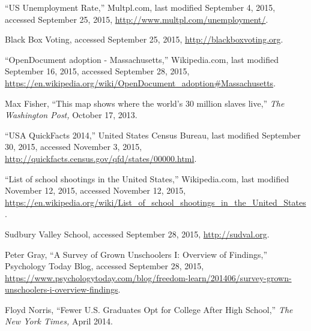 \begin{thebibliography}{99}
``US Unemployment Rate,''
Multpl.com,
last modified September 4, 2015,
accessed September 25, 2015,
\url{http://www.multpl.com/unemployment/}.

Black Box Voting,
accessed September 25, 2015,
\url{http://blackboxvoting.org}.

``OpenDocument adoption - Massachusetts,''
Wikipedia.com,
last modified September 16, 2015,
accessed September 28, 2015,
\url{https://en.wikipedia.org/wiki/OpenDocument\_adoption#Massachusetts}.

Max Fisher,
``This map shows where the world's 30 million slaves live,''
\emph{The Washington Post,}
October 17, 2013.

``USA QuickFacts 2014,''
United States Census Bureau,
last modified September 30, 2015,
accessed November 3, 2015,
\url{http://quickfacts.census.gov/qfd/states/00000.html}.

``List of school shootings in the United States,''
Wikipedia.com,
last modified November 12, 2015,
accessed November 12, 2015,
\url{https://en.wikipedia.org/wiki/List_of_school_shootings_in_the_United_States}.

Sudbury Valley School,
accessed September 28, 2015,
\url{http://sudval.org}.

Peter Gray,
``A Survey of Grown Unschoolers I: Overview of Findings,''
Psychology Today Blog,
accessed September 28, 2015,
\url{https://www.psychologytoday.com/blog/freedom-learn/201406/survey-grown-unschoolers-i-overview-findings}.

Floyd Norris,
``Fewer U.S. Graduates Opt for College After High School,''
\emph{The New York Times,}
April 2014.

\end{thebibliography}
